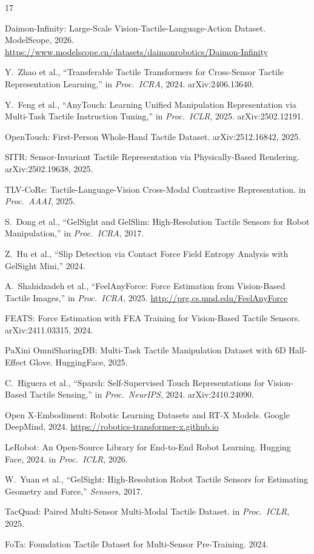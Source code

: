 \documentclass[conference]{IEEEtran}
\begin{document}

\begin{thebibliography}{17}

Daimon-Infinity: Large-Scale Vision-Tactile-Language-Action Dataset. ModelScope, 2026. \url{https://www.modelscope.cn/datasets/daimonrobotics/Daimon-Infinity}

Y.~Zhao et al., ``Transferable Tactile Transformers for Cross-Sensor Tactile Representation Learning,'' in \emph{Proc.\ ICRA}, 2024. arXiv:2406.13640.

Y.~Feng et al., ``AnyTouch: Learning Unified Manipulation Representation via Multi-Task Tactile Instruction Tuning,'' in \emph{Proc.\ ICLR}, 2025. arXiv:2502.12191.

OpenTouch: First-Person Whole-Hand Tactile Dataset. arXiv:2512.16842, 2025.

SITR: Sensor-Invariant Tactile Representation via Physically-Based Rendering. arXiv:2502.19638, 2025.

TLV-CoRe: Tactile-Language-Vision Cross-Modal Contrastive Representation. in \emph{Proc.\ AAAI}, 2025.

S.~Dong et al., ``GelSight and GelSlim: High-Resolution Tactile Sensors for Robot Manipulation,'' in \emph{Proc.\ ICRA}, 2017.

Z.~Hu et al., ``Slip Detection via Contact Force Field Entropy Analysis with GelSight Mini,'' 2024.

A.~Shahidzadeh et al., ``FeelAnyForce: Force Estimation from Vision-Based Tactile Images,'' in \emph{Proc.\ ICRA}, 2025. \url{http://prg.cs.umd.edu/FeelAnyForce}

FEATS: Force Estimation with FEA Training for Vision-Based Tactile Sensors. arXiv:2411.03315, 2024.

PaXini OmniSharingDB: Multi-Task Tactile Manipulation Dataset with 6D Hall-Effect Glove. HuggingFace, 2025.

C.~Higuera et al., ``Sparsh: Self-Supervised Touch Representations for Vision-Based Tactile Sensing,'' in \emph{Proc.\ NeurIPS}, 2024. arXiv:2410.24090.

Open X-Embodiment: Robotic Learning Datasets and RT-X Models. Google DeepMind, 2024. \url{https://robotics-transformer-x.github.io}

LeRobot: An Open-Source Library for End-to-End Robot Learning. Hugging Face, 2024. in \emph{Proc.\ ICLR}, 2026.

W.~Yuan et al., ``GelSight: High-Resolution Robot Tactile Sensors for Estimating Geometry and Force,'' \emph{Sensors}, 2017.

TacQuad: Paired Multi-Sensor Multi-Modal Tactile Dataset. in \emph{Proc.\ ICLR}, 2025.

FoTa: Foundation Tactile Dataset for Multi-Sensor Pre-Training. 2024.

\end{thebibliography}
\end{document}
